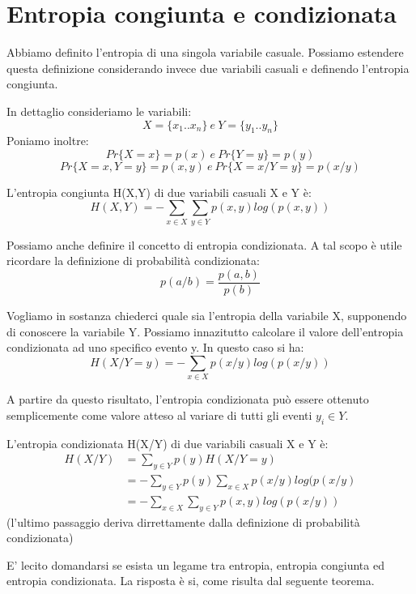 \section{Entropia congiunta e condizionata}
Abbiamo definito l'entropia di una singola variabile casuale. Possiamo estendere questa definizione 
considerando invece due variabili casuali e definendo l'entropia congiunta.

In dettaglio consideriamo le variabili:
\[X=\{x_1..x_n\} \ e \ Y=\{y_1..y_n\}\]
Poniamo inoltre:
\[Pr\{X=x\}=p(x) \ e \ Pr\{Y=y\}=p(y) \]
\[Pr\{X=x,Y=y\}=p(x,y) \ e \ Pr\{X=x/Y=y\}=p(x/y) \]

\begin{definizione}
 L'entropia congiunta H(X,Y) di due variabili casuali X e Y è:
 \[ H(X,Y)=-\sum_{x \in X} \sum_{y \in Y} p(x,y)log( p(x,y) ) \]
\end{definizione}

Possiamo anche definire il concetto di entropia condizionata.
A tal scopo è utile ricordare la definizione di probabilità condizionata:
  \[ p(a/b)=\frac{p(a,b)}{p(b)} \]

Vogliamo in sostanza chiederci quale sia l'entropia della variabile X, supponendo di conoscere la variabile Y.
Possiamo innazitutto calcolare il valore dell'entropia condizionata ad uno specifico evento y.
In questo caso si ha:
\[
 H(X/Y=y)= -\sum_{x \in X} p(x/y)log(p(x/y))
\]

A partire da questo risultato, l'entropia condizionata può essere ottenuto semplicemente 
come valore atteso al variare di tutti gli eventi $y_i \in Y$.

\begin{definizione}
 L'entropia condizionata H(X/Y) di due variabili casuali X e Y è:
 \[
  \begin{split}
    H(X/Y) &=  \sum_{y \in Y}p(y)H(X/Y=y)  \\
         &= -\sum_{y \in Y} p(y) \sum_{x \in X} p(x/y)log(p(x/y) \\
         &= -\sum_{x \in X} \sum_{y \in Y} p(x,y)log( p(x/y) )
  \end{split}
  \]
 (l'ultimo passaggio deriva dirrettamente dalla definizione di probabilità condizionata)
\end{definizione}

E' lecito domandarsi se esista un legame tra entropia, entropia congiunta ed entropia condizionata.
La risposta è si, come risulta dal seguente teorema.

